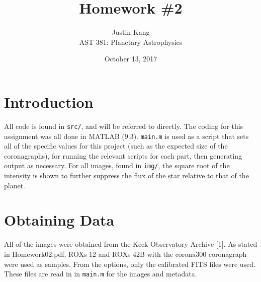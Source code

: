 \documentclass[12pt]{article}
\title{\vspace{-3em} \textbf{Homework \#2}}
\author{Justin Kang \\ AST 381: Planetary Astrophysics}
\date{October 13, 2017}
\begin{document}
\maketitle


\section*{Introduction}
All code is found in \texttt{src/}, and will be referred to directly. The coding for this assignment was all done in MATLAB (9.3). \texttt{main.m} is used as a script that sets all of the specific values for this project (such as the expected size of the coronagraphs), for running the relevant scripts for each part, then generating output as necessary. For all images, found in \texttt{img/}, the square root of the intensity is shown to further suppress the flux of the star relative to that of the planet.


\section{Obtaining Data}
All of the images were obtained from the Keck Observatory Archive [1]. As stated in Homework02.pdf, ROXs 12 and ROXs 42B with the corona300 coronagraph were used as samples. From the options, only the calibrated FITS files were used. These files are read in in \texttt{main.m} for the images and metadata. 
\end{document}
